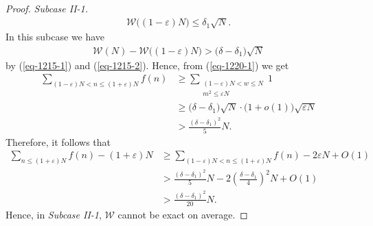 \documentclass[10pt,a4paper]{amsart}
\begin{document}
\begin{proof}
{\it Subcase II-1.}  
\begin{align}\label{eq-1215-2}
\mathcal{W}\Big((1-\varepsilon)N\Big)\le\delta_1 \sqrt{N}.
\end{align} 
In this subcase we have 
\begin{align}\label{eq-1220-1}
\mathcal{W}(N)-\mathcal{W}\Big((1-\varepsilon)N\Big)>\big(\delta-\delta_1\big)\sqrt{N}
\end{align} 
by (\ref{eq-1215-1}) and (\ref{eq-1215-2}). Hence, from (\ref{eq-1220-1}) we get
\begin{align*}
\sum_{(1-\varepsilon)N<n\le (1+\varepsilon)N}f(n)&\ge \sum_{\substack{(1-\varepsilon)N<w\le N\\ m^2\le \varepsilon N}}1\\
& \ge \big(\delta-\delta_1\big)\sqrt{N}\cdot\Big(1+o(1)\Big)\sqrt{\varepsilon N}\\
&>\frac{(\delta-\delta_1)^2}{5}N.
\end{align*}
Therefore, it follows that
\begin{align*}
\sum_{n\le (1+\varepsilon)N}f(n)-(1+\varepsilon)N&\ge \sum_{(1-\varepsilon)N<n\le (1+\varepsilon)N}f(n)-2\varepsilon N+O(1)\\
&>\frac{(\delta-\delta_1)^2}{5}N- 2\left(\frac{\delta-\delta_1}{4}\right)^2N+O(1)\\
&>\frac{(\delta-\delta_1)^2}{20}N.
\end{align*}
Hence, in {\it Subcase II-1}, $\mathcal{W}$ cannot be exact on average. 


\end{proof}
\end{document}
